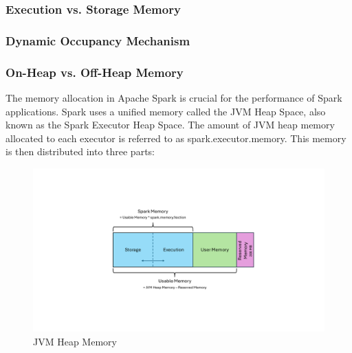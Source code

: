\subsubsection{Execution vs. Storage Memory}
\subsubsection{Dynamic Occupancy Mechanism}
\subsubsection{On-Heap vs. Off-Heap Memory}

The memory allocation in Apache Spark is crucial for the performance of Spark applications. Spark uses a unified memory called the JVM Heap Space, also known as the Spark Executor Heap Space. The amount of JVM heap memory allocated to each executor is referred to as spark.executor.memory. This memory is then distributed into three parts: 

\begin{figure}[ht]
    \centering
    \includegraphics[width=0.7\linewidth]{images/Spark_mem_man.pdf}
    \caption{JVM Heap Memory}
    \label{fig:spark-mem-man}
\end{figure}

